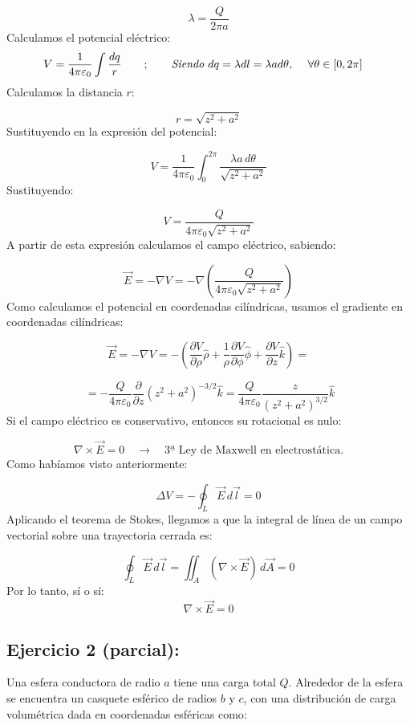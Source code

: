 \documentclass[a4paper,12pt]{article}
\begin{document}
\[
\lambda = \frac{Q}{2\pi a}
\]
Calculamos el potencial eléctrico:
\begin{align*}
V = \frac{1}{4\pi \varepsilon_0} \int \frac{dq}{r}
& \qquad ; \qquad
\textit{Siendo $dq = \lambda dl = \lambda a d\theta$, \quad $\forall \theta \in [0,2\pi]$} 
\end{align*}
Calculamos la distancia $r$:

\[
r = \sqrt{z^2 + a^2}
\]
Sustituyendo en la expresión del potencial:

\[
V = \frac{1}{4\pi \varepsilon_0} \int_{0}^{2\pi} \frac{\lambda a\, d\theta}{\sqrt{z^2 + a^2}}
\]
Sustituyendo:

\[
V = \frac{Q}{4\pi \varepsilon_0 \sqrt{z^2 + a^2}}
\]
A partir de esta expresión calculamos el campo eléctrico, sabiendo:

\[
\vec{E} = - \nabla V = - \nabla \left( \frac{Q}{4\pi \varepsilon_0 \sqrt{z^2 + a^2}} \right)
\]
Como calculamos el potencial en coordenadas cilíndricas, usamos el gradiente en coordenadas cilíndricas:

\[
\vec{E} = - \nabla V = - \left( \frac{\partial V}{\partial \rho} \hat{\rho} + \frac{1}{\rho}\frac{\partial V}{\partial \phi}\hat{\phi} + \frac{\partial V}{\partial z}\hat{k} \right) =
\]

\[
\ = - \frac{Q}{4\pi \varepsilon_0} \frac{\partial}{\partial z} (z^2 + a^2)^{-3/2} \hat{k} = \frac{Q}{4\pi \varepsilon_0} \frac{z}{(z^2 + a^2)^{3/2}} \hat{k}
\]
\newpage
\noindent
Si el campo eléctrico es conservativo, entonces su rotacional es nulo:

\[
\nabla \times \vec{E} = 0
\quad \rightarrow \quad
\text{3ª Ley de Maxwell en electrostática.}
\]
Como habíamos visto anteriormente:

\[
\Delta V = - \oint_{L} \vec{E}\, d\vec{l} = 0
\]
Aplicando el teorema de Stokes, llegamos a que la integral de línea de un campo vectorial sobre una trayectoria cerrada es:

\[
\oint_{L} \vec{E}\, d\vec{l} = \iint_{A} (\nabla \times \vec{E})\, d\vec{A} = 0
\]
Por lo tanto, sí o sí:
\[
\nabla \times \vec{E} = 0
\]

\subsection*{Ejercicio 2 (parcial):} 
\noindent
Una esfera conductora de radio $a$ tiene una carga total $Q$.  
Alrededor de la esfera se encuentra un casquete esférico de radios $b$ y $c$, con una distribución de carga volumétrica dada en coordenadas esféricas como:
\end{document}
